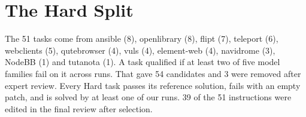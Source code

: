 %

\clearpage        %
\raggedbottom     %
\appendix

\section{The Hard Split}
\label{app:hard}

The 51 tasks come from ansible (8), openlibrary (8), flipt (7), teleport (6), webclients (5), qutebrowser (4), vuls (4), element-web (4), navidrome (3), NodeBB (1) and tutanota (1). A task qualified if at least two of five model families fail on it across runs. That gave 54 candidates and 3 were removed after expert review. Every Hard task passes its reference solution, fails with an empty patch, and is solved by at least one of our runs. 39 of the 51 instructions were edited in the final review after selection. 



